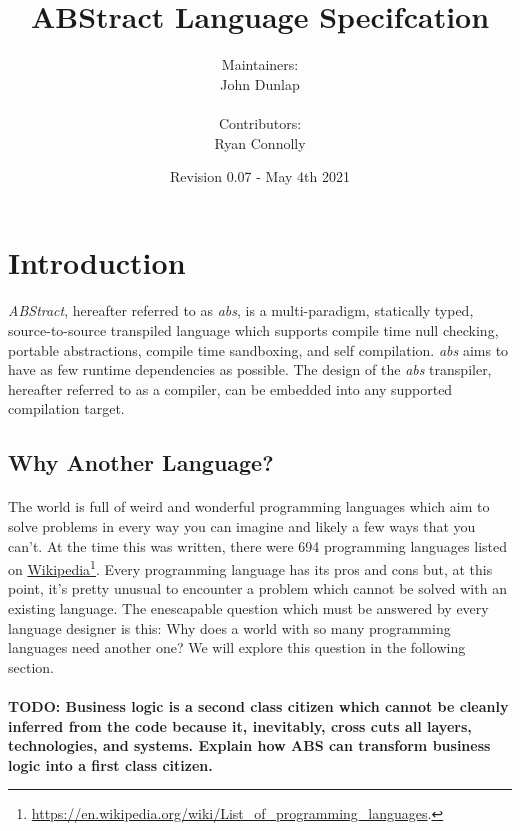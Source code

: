 \documentclass[hidelinks]{article}
\title{\textbf{ABStract Language Specifcation}}
\date{Revision 0.07 - May 4th 2021}
\author{Maintainers:\\John Dunlap\\\\Contributors:\\Ryan Connolly}
\begin{document}
\maketitle
\newpage
{}
\tableofcontents{}
\newpage

\section{Introduction}
\paragraph{}\textit{ABStract}, hereafter referred to as \textit{abs}, is a multi-paradigm, statically typed, source-to-source transpiled language which supports compile time null checking, portable abstractions, compile time sandboxing, and self compilation. \textit{abs} aims to have as few runtime dependencies as possible. The design of the \textit{abs} transpiler, hereafter referred to as a compiler, can be embedded into any supported compilation target. 

\subsection{Why Another Language?}
\paragraph{}
The world is full of weird and wonderful programming languages which aim to solve problems in every way you can imagine and likely a few ways that you can't. At the time this was written, there were 694 programming languages listed on \href{https://en.wikipedia.org/wiki/List_of_programming_languages}{{\color{blue}Wikipedia}}\footnote{\url{https://en.wikipedia.org/wiki/List_of_programming_languages}.}. Every programming language has its pros and cons but, at this point, it's pretty unusual to encounter a problem which cannot be solved with an existing language. The enescapable question which must be answered by every language designer is this: Why does a world with so many programming languages need another one? We will explore this question in the following section.

\paragraph{}\textbf{TODO: Business logic is a second class citizen which cannot be cleanly inferred from the code because it, inevitably, cross cuts all layers, technologies, and systems. Explain how ABS can transform business logic into a first class citizen.}
\end{document}
